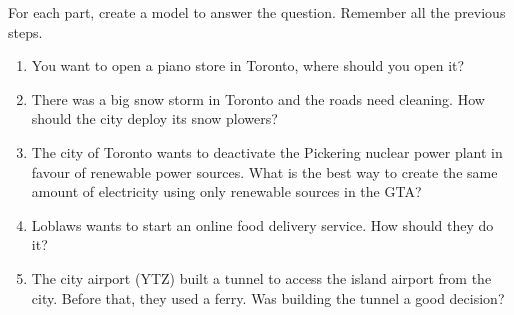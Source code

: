\begin{exercises}
	\begin{problist}
	\prob
	For each part, create a model to answer the question. Remember all the previous steps.

	\begin{enumerate}
	\item You want to open a piano store in Toronto, where should you open it?
	\item There was a big snow storm in Toronto and the roads need cleaning. How should the city deploy its snow plowers?
	\item The city of Toronto wants to deactivate the Pickering nuclear power plant in favour of renewable power sources. What is the best way to create the same amount of electricity using only renewable sources in the GTA?
	\item Loblaws wants to start an online food delivery service. How should they do it?
	\item The city airport (YTZ) built a tunnel to access the island airport from the city. Before that, they used a ferry. Was building the tunnel a good decision?	
		\end{enumerate}
	\end{problist}
\end{exercises}
